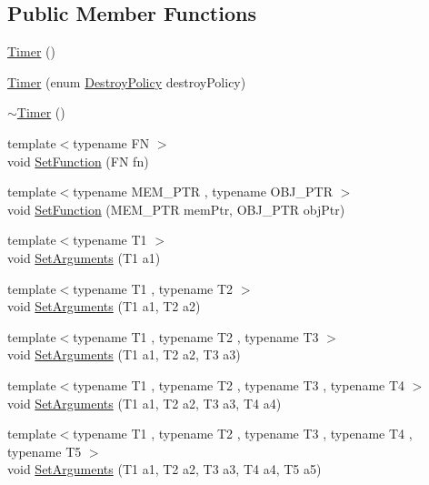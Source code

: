 \subsection*{Public Member Functions}
\begin{DoxyCompactItemize}
\item 
\hyperlink{classns3_1_1Timer_a31dd8468641da2f332eebe7e629d632a}{Timer} ()
\item 
\hyperlink{classns3_1_1Timer_abbb65fb76c04f3607170401267c71404}{Timer} (enum \hyperlink{classns3_1_1Timer_a816309b83cd2a35bea47d9bbc6bbf721}{Destroy\+Policy} destroy\+Policy)
\item 
\hyperlink{classns3_1_1Timer_a28be7e74382598fc10b3f4424c62bb41}{$\sim$\+Timer} ()
\item 
{\footnotesize template$<$typename FN $>$ }\\void \hyperlink{classns3_1_1Timer_a044b29030c9de99298d51ac0ccfc104c}{Set\+Function} (FN fn)
\item 
{\footnotesize template$<$typename M\+E\+M\+\_\+\+P\+TR , typename O\+B\+J\+\_\+\+P\+TR $>$ }\\void \hyperlink{classns3_1_1Timer_af4028d3accbba143fa5af20415c4d95a}{Set\+Function} (M\+E\+M\+\_\+\+P\+TR mem\+Ptr, O\+B\+J\+\_\+\+P\+TR obj\+Ptr)
\item 
{\footnotesize template$<$typename T1 $>$ }\\void \hyperlink{classns3_1_1Timer_a39c525dcde3109fb4d95737de3bdf85a}{Set\+Arguments} (T1 a1)
\item 
{\footnotesize template$<$typename T1 , typename T2 $>$ }\\void \hyperlink{classns3_1_1Timer_a3332dd40ca2407e7a446c5e59144dfaa}{Set\+Arguments} (T1 a1, T2 a2)
\item 
{\footnotesize template$<$typename T1 , typename T2 , typename T3 $>$ }\\void \hyperlink{classns3_1_1Timer_a6fafa4d66dc371245e01d5d29306d61f}{Set\+Arguments} (T1 a1, T2 a2, T3 a3)
\item 
{\footnotesize template$<$typename T1 , typename T2 , typename T3 , typename T4 $>$ }\\void \hyperlink{classns3_1_1Timer_a4076c7f6003b27ccba06fad55a1e8dd2}{Set\+Arguments} (T1 a1, T2 a2, T3 a3, T4 a4)
\item 
{\footnotesize template$<$typename T1 , typename T2 , typename T3 , typename T4 , typename T5 $>$ }\\void \hyperlink{classns3_1_1Timer_aa79a70b6df4c319bea0d643d5bbd4a2c}{Set\+Arguments} (T1 a1, T2 a2, T3 a3, T4 a4, T5 a5)

\end{DoxyCompactItemize}
